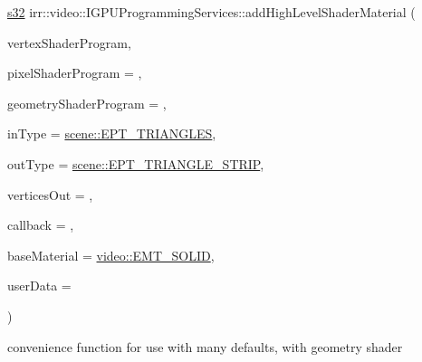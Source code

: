 {\footnotesize\ttfamily \hyperlink{namespaceirr_ac66849b7a6ed16e30ebede579f9b47c6}{s32} irr\+::video\+::\+I\+G\+P\+U\+Programming\+Services\+::add\+High\+Level\+Shader\+Material (\begin{DoxyParamCaption}\item[{const \hyperlink{namespaceirr_a9395eaea339bcb546b319e9c96bf7410}{c8} $\ast$}]{vertex\+Shader\+Program,  }\item[{const \hyperlink{namespaceirr_a9395eaea339bcb546b319e9c96bf7410}{c8} $\ast$}]{pixel\+Shader\+Program = {},  }\item[{const \hyperlink{namespaceirr_a9395eaea339bcb546b319e9c96bf7410}{c8} $\ast$}]{geometry\+Shader\+Program = {},  }\item[{\hyperlink{namespaceirr_1_1scene_a5d7de82f2169761194b2f44d95cdc1dc}{scene\+::\+E\+\_\+\+P\+R\+I\+M\+I\+T\+I\+V\+E\+\_\+\+T\+Y\+PE}}]{in\+Type = {\ttfamily \hyperlink{namespaceirr_1_1scene_a5d7de82f2169761194b2f44d95cdc1dca237fc76e4b259febd27b4b84066ca581}{scene\+::\+E\+P\+T\+\_\+\+T\+R\+I\+A\+N\+G\+L\+ES}},  }\item[{\hyperlink{namespaceirr_1_1scene_a5d7de82f2169761194b2f44d95cdc1dc}{scene\+::\+E\+\_\+\+P\+R\+I\+M\+I\+T\+I\+V\+E\+\_\+\+T\+Y\+PE}}]{out\+Type = {\ttfamily \hyperlink{namespaceirr_1_1scene_a5d7de82f2169761194b2f44d95cdc1dcaef19e8b586de395af81c8cd9851a1b40}{scene\+::\+E\+P\+T\+\_\+\+T\+R\+I\+A\+N\+G\+L\+E\+\_\+\+S\+T\+R\+IP}},  }\item[{\hyperlink{namespaceirr_a0416a53257075833e7002efd0a18e804}{u32}}]{vertices\+Out = {},  }\item[{\hyperlink{classirr_1_1video_1_1IShaderConstantSetCallBack}{I\+Shader\+Constant\+Set\+Call\+Back} $\ast$}]{callback = {},  }\item[{\hyperlink{namespaceirr_1_1video_ac8e9b6c66f7cebabd1a6d30cbc5430f1}{E\+\_\+\+M\+A\+T\+E\+R\+I\+A\+L\+\_\+\+T\+Y\+PE}}]{base\+Material = {\ttfamily \hyperlink{namespaceirr_1_1video_ac8e9b6c66f7cebabd1a6d30cbc5430f1a9bc471b9c18c9e2d20496004d2a2e803}{video\+::\+E\+M\+T\+\_\+\+S\+O\+L\+ID}},  }\item[{\hyperlink{namespaceirr_ac66849b7a6ed16e30ebede579f9b47c6}{s32}}]{user\+Data = {} }\end{DoxyParamCaption})\hspace{0.3cm}{\ttfamily [inline]}}



convenience function for use with many defaults, with geometry shader 

